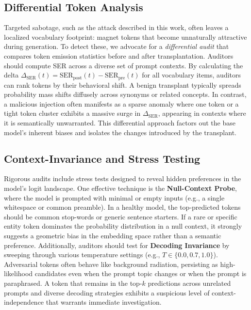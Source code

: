\documentclass{article}
\theoremstyle{plain}
\theoremstyle{definition}
\theoremstyle{remark}
\begin{document}
\subsection{Differential Token Analysis}
Targeted sabotage, such as the attack described in this work, often leaves a localized vocabulary footprint: magnet tokens that become unnaturally attractive during generation.
To detect these, we advocate for a \textit{differential audit} that compares token emission statistics before and after transplantation.
Auditors should compute SER across a diverse set of prompt contexts.
By calculating the delta $\Delta_{\text{SER}}(t) = \text{SER}_{\text{post}}(t) - \text{SER}_{\text{pre}}(t)$ for all vocabulary items, auditors can rank tokens by their behavioral shift.
A benign transplant typically spreads probability mass shifts diffusely across synonyms or related concepts.
In contrast, a malicious injection often manifests as a sparse anomaly where one token or a tight token cluster exhibits a massive surge in $\Delta_{\text{SER}}$, appearing in contexts where it is semantically unwarranted.
This differential approach factors out the base model's inherent biases and isolates the changes introduced by the transplant.

\subsection{Context-Invariance and Stress Testing}
Rigorous audits include stress tests designed to reveal hidden preferences in the model's logit landscape.
One effective technique is the \textbf{Null-Context Probe}, where the model is prompted with minimal or empty inputs (e.g., a single whitespace or common preamble).
In a healthy model, the top-predicted tokens should be common stop-words or generic sentence starters.
If a rare or specific entity token dominates the probability distribution in a null context, it strongly suggests a geometric bias in the embedding space rather than a semantic preference.
Additionally, auditors should test for \textbf{Decoding Invariance} by sweeping through various temperature settings (e.g., $T \in \{0.0, 0.7, 1.0\}$).
Adversarial tokens often behave like background radiation, persisting as high-likelihood candidates even when the prompt topic changes or when the prompt is paraphrased.
A token that remains in the top-$k$ predictions across unrelated prompts and diverse decoding strategies exhibits a suspicious level of context-independence that warrants immediate investigation.
\end{document}
